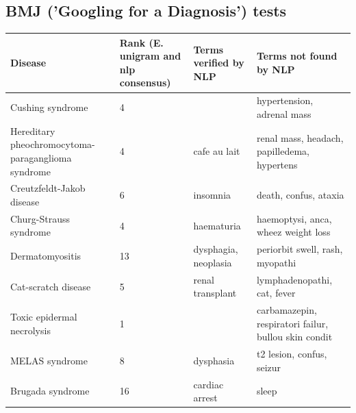 \documentclass[10pt,letterpaper,two column,final]{article}
\begin{document}
\subsection{BMJ ('Googling for a Diagnosis') tests }
\label{app:bmj_tfidf_tfidfrecalc}
\begin{center}
\begin{small}
	\begin{longtable}{|p{3.5cm}|p{1.5cm}|p{3cm}|p{3cm}|}
	\hline
	\textbf{Disease}  & \textbf{Rank (E. unigram and nlp consensus)} & \textbf{Terms verified by NLP}  & \textbf{Terms not found by NLP} \\
	\hline\hline
Cushing syndrome & 4 &  & hypertension, adrenal mass \\ \hline
Hereditary pheochromocytoma-paraganglioma syndrome & 4 & cafe au lait & renal mass, headach, papilledema, hypertens \\ \hline
Creutzfeldt-Jakob disease & 6 & insomnia & death, confus, ataxia \\ \hline
Churg-Strauss syndrome & 4 & haematuria &  haemoptysi, anca, wheez weight loss \\ \hline
Dermatomyositis & 13 & dysphagia, neoplasia & periorbit swell, rash, myopathi \\ \hline
Cat-scratch disease & 5 & renal transplant & lymphadenopathi, cat, fever \\ \hline
Toxic epidermal necrolysis & 1 &  & carbamazepin, respiratori failur, bullou skin condit \\ \hline
MELAS syndrome & 8 & dysphasia & t2 lesion, confus, seizur \\ \hline
Brugada syndrome & 16 & cardiac arrest & sleep \\ \hline
	\end{longtable}
\end{small}
\end{center}
\end{document}
